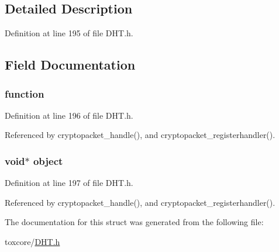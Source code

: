 \subsection{Detailed Description}


Definition at line 195 of file D\+H\+T.\+h.



\subsection{Field Documentation}
\hypertarget{struct_cryptopacket___handles_a9313784040f9666743d9aff915543903}{
\subsubsection[{function}]{ function}}\label{struct_cryptopacket___handles_a9313784040f9666743d9aff915543903}


Definition at line 196 of file D\+H\+T.\+h.



Referenced by cryptopacket\+\_\+handle(), and cryptopacket\+\_\+registerhandler().

\hypertarget{struct_cryptopacket___handles_a077376d12464f945e2414d5499c79b3f}{
\subsubsection[{object}]{\setlength{\rightskip}{0pt plus 5cm}void$\ast$ object}}\label{struct_cryptopacket___handles_a077376d12464f945e2414d5499c79b3f}


Definition at line 197 of file D\+H\+T.\+h.



Referenced by cryptopacket\+\_\+handle(), and cryptopacket\+\_\+registerhandler().



The documentation for this struct was generated from the following file\+:\begin{DoxyCompactItemize}
\item 
toxcore/\hyperlink{_d_h_t_8h}{D\+H\+T.\+h}\end{DoxyCompactItemize}
